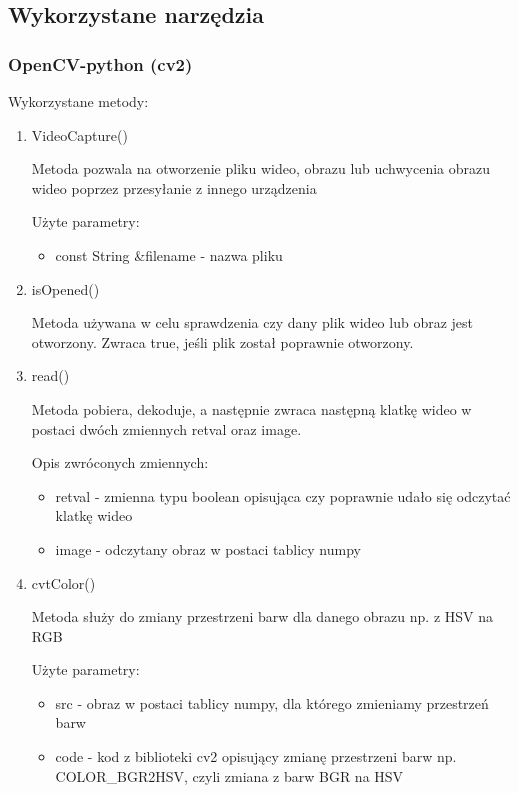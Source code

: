 \documentclass{article}
\begin{document}
\subsection{Wykorzystane narzędzia}
\label{Wykorzystane narzędzia}

\subsubsection{OpenCV-python (cv2)}
\label{OpenCV-python (cv2)}

Wykorzystane metody:
\begin{enumerate}
\item VideoCapture() \cite{opencv1}

Metoda pozwala na otworzenie pliku wideo, obrazu lub uchwycenia obrazu wideo poprzez przesyłanie z innego urządzenia

Użyte parametry:
\begin{itemize}
\item const String \&filename - nazwa pliku
\end{itemize}

\item isOpened() \cite{opencv2}

Metoda używana w celu sprawdzenia czy dany plik wideo lub obraz jest otworzony. Zwraca true, jeśli plik został poprawnie otworzony.

\item read() \cite{opencv3}

Metoda pobiera, dekoduje, a następnie zwraca następną klatkę wideo w postaci dwóch zmiennych retval oraz image.

Opis zwróconych zmiennych:
\begin{itemize}
\item retval - zmienna typu boolean opisująca czy poprawnie udało się odczytać klatkę wideo
\item image - odczytany obraz w postaci tablicy numpy
\end{itemize}

\item cvtColor() \cite{opencv4}

Metoda służy do zmiany przestrzeni barw dla danego obrazu np. z HSV na RGB

Użyte parametry:
\begin{itemize}

\item src - obraz w postaci tablicy numpy, dla którego zmieniamy przestrzeń barw
\item code - kod z biblioteki cv2 opisujący zmianę przestrzeni barw np. COLOR\_BGR2HSV, czyli zmiana z barw BGR na HSV


\end{itemize}
\end{enumerate}
\end{document}
